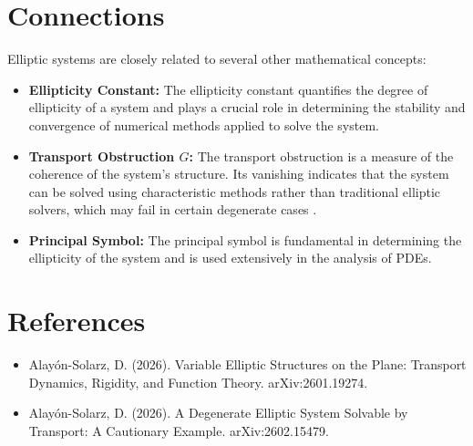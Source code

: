 \documentclass[11pt,a4paper]{article}
\begin{document}
\section{Connections}
Elliptic systems are closely related to several other mathematical concepts:

\begin{itemize}
    \item \textbf{Ellipticity Constant:} The ellipticity constant quantifies the degree of ellipticity of a system and plays a crucial role in determining the stability and convergence of numerical methods applied to solve the system.
    \item \textbf{Transport Obstruction \( G \):} The transport obstruction is a measure of the coherence of the system's structure. Its vanishing indicates that the system can be solved using characteristic methods rather than traditional elliptic solvers, which may fail in certain degenerate cases \cite{arxiv:2602.15479}.
    \item \textbf{Principal Symbol:} The principal symbol is fundamental in determining the ellipticity of the system and is used extensively in the analysis of PDEs.
\end{itemize}

\section{References}
\begin{itemize}
    \item Alayón-Solarz, D. (2026). Variable Elliptic Structures on the Plane: Transport Dynamics, Rigidity, and Function Theory. arXiv:2601.19274.
    \item Alayón-Solarz, D. (2026). A Degenerate Elliptic System Solvable by Transport: A Cautionary Example. arXiv:2602.15479.
\end{itemize}
\end{document}
